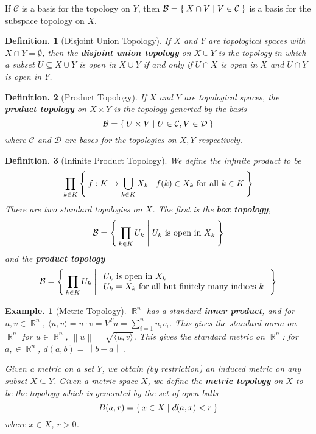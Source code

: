 \documentclass[11pt, a4paper]{memoir}
\DeclareMathOperator{\R}{{\mathbb{R}}}
\newcommand{\norm}[1]{\ensuremath{\left\lVert#1\right\rVert}}
\theoremstyle{change}
\theoremstyle{plain}
\theoremstyle{nonumberplain}
\newtheorem{definition}{Definition.}
\newtheorem{example}{Example.}
\newcommand{\inner}[2]{\ensuremath{\langle #1,#2\rangle}}
\numberwithin{equation}{section}
\begin{document}
If $\mathcal{C}$ is a basis for the topology on $Y$, then $\mathcal{B}=\Set{X\cap V | V\in\mathcal{C}}$ is a basis for the subspace topology on $X$.
\begin{definition}[Disjoint Union Topology]
    If $X$ and $Y$ are topological spaces with $X\cap Y=\emptyset$, then the \textbf{disjoint union topology} on $X\cup Y$ is the topology in which a subset $U\subseteq X\cup Y$ is open in $X\cup Y$ if and only if $U\cap X$ is open in $X$ and $U\cap Y$ is open in $Y$.
\end{definition}
\begin{definition}[Product Topology]
    If $X$ and $Y$ are topological spaces, the \textbf{product topology} on $X\times Y$ is the topology generted by the basis
    \begin{equation*}
        \mathcal{B}=\Set{U\times V | U\in\mathcal{C},V\in\mathcal{D}}
    \end{equation*}
    where $\mathcal{C}$ and $\mathcal{D}$ are bases for the topologies on $X,Y$ respectively.
\end{definition}
\begin{definition}[Infinite Product Topology]
    We define the infinite product to be
    \begin{equation*}
        \prod_{k\in K}\Set{f:K\to \bigcup_{k\in K}X_k | f(k)\in X_k\text{ for all }k\in K}
    \end{equation*}
    There are two standard topologies on $X$.
    The first is the \textbf{box topology},
    \begin{equation*}
        \mathcal{B}=\Set{\prod_{k\in K}U_k | U_k\text{ is open in }X_k}
    \end{equation*}
    and the \textbf{product topology}
    \begin{equation*}
        \mathcal{B}=\Set{\prod_{k\in K}U_k | \begin{array}{l}U_k\text{ is open in }X_k\\U_k=X_k\text{ for all but finitely many indices }k\end{array}}
    \end{equation*}
\end{definition}
\begin{example}[Metric Topology]
    $\R^n$ has a standard \textbf{inner product}, and for $u,v\in\R^n$, $\inner{u}{v}=u\cdot v=V^Tu=\sum_{i=1}^n u_iv_i$.
    This gives the standard norm on $\R^n$ for $u\in\R^n$, $\norm{u}=\sqrt{\inner{u}{v}}$.
    This gives the standard metric on $\R^n$: for $a,\in\R^n$, $d(a,b)=\norm{b-a}$.

    Given a metric on a set $Y$, we obtain (by restriction) an induced metric on any subset $X\subseteq Y$.
    Given a metric space $X$, we define the \textbf{metric topology} on $X$ to be the topology which is generated by the set of open balls
    \begin{equation*}
        B(a,r) = \Set{x\in X | d(a,x)<r}
    \end{equation*}
    where $x\in X$, $r>0$.
\end{example}
\end{document}
